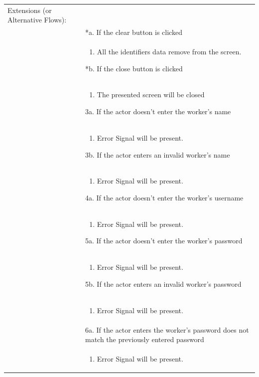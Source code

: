 \documentclass[12pt,a4paper]{article}
\begin{document}
\begin{longtable}{| p{3cm}|p{12cm}|}
Extensions (or Alternative Flows):\\
& *a. If the clear button is clicked \\
& \begin{enumerate}
		\item All the identifiers data remove from the screen.
	\end{enumerate}
*b. If the close button is clicked\\
&	\begin{enumerate}
		\item The presented screen will be closed
	\end{enumerate}
3a. If the actor doesn't enter the worker's name \\ 	
&	\begin{enumerate}
		\item Error Signal will be present.
	\end{enumerate}
3b. If the actor enters an invalid worker's name \\ 	
&	\begin{enumerate}
		\item Error Signal will be present.
	\end{enumerate}
4a. If the actor doesn't enter the worker's username\\ 	
&	\begin{enumerate}
		\item Error Signal will be present.
	\end{enumerate}
5a. If the actor doesn't enter the worker's password \\ 	
&	\begin{enumerate}
		\item Error Signal will be present.
	\end{enumerate}
5b. If the actor enters an invalid worker's password \\ 	
&	\begin{enumerate}
		\item Error Signal will be present.
	\end{enumerate}
\\

& 6a. If the actor enters the worker's password does not match the previously entered password \\ 	
&	\begin{enumerate}
		\item Error Signal will be present.
	\end{enumerate}



\end{longtable}
\end{document}
